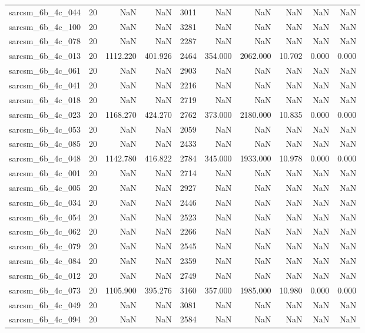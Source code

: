 \begin{tabular}{lrrrrrrrrr}
sarcsm\_6b\_4c\_044 & 20 & NaN & NaN & 3011 & NaN & NaN & NaN & NaN & NaN \\
sarcsm\_6b\_4c\_100 & 20 & NaN & NaN & 3281 & NaN & NaN & NaN & NaN & NaN \\
sarcsm\_6b\_4c\_078 & 20 & NaN & NaN & 2287 & NaN & NaN & NaN & NaN & NaN \\
sarcsm\_6b\_4c\_013 & 20 & 1112.220 & 401.926 & 2464 & 354.000 & 2062.000 & 10.702 & 0.000 & 0.000 \\
sarcsm\_6b\_4c\_061 & 20 & NaN & NaN & 2903 & NaN & NaN & NaN & NaN & NaN \\
sarcsm\_6b\_4c\_041 & 20 & NaN & NaN & 2216 & NaN & NaN & NaN & NaN & NaN \\
sarcsm\_6b\_4c\_018 & 20 & NaN & NaN & 2719 & NaN & NaN & NaN & NaN & NaN \\
sarcsm\_6b\_4c\_023 & 20 & 1168.270 & 424.270 & 2762 & 373.000 & 2180.000 & 10.835 & 0.000 & 0.000 \\
sarcsm\_6b\_4c\_053 & 20 & NaN & NaN & 2059 & NaN & NaN & NaN & NaN & NaN \\
sarcsm\_6b\_4c\_085 & 20 & NaN & NaN & 2433 & NaN & NaN & NaN & NaN & NaN \\
sarcsm\_6b\_4c\_048 & 20 & 1142.780 & 416.822 & 2784 & 345.000 & 1933.000 & 10.978 & 0.000 & 0.000 \\
sarcsm\_6b\_4c\_001 & 20 & NaN & NaN & 2714 & NaN & NaN & NaN & NaN & NaN \\
sarcsm\_6b\_4c\_005 & 20 & NaN & NaN & 2927 & NaN & NaN & NaN & NaN & NaN \\
sarcsm\_6b\_4c\_034 & 20 & NaN & NaN & 2446 & NaN & NaN & NaN & NaN & NaN \\
sarcsm\_6b\_4c\_054 & 20 & NaN & NaN & 2523 & NaN & NaN & NaN & NaN & NaN \\
sarcsm\_6b\_4c\_062 & 20 & NaN & NaN & 2266 & NaN & NaN & NaN & NaN & NaN \\
sarcsm\_6b\_4c\_079 & 20 & NaN & NaN & 2545 & NaN & NaN & NaN & NaN & NaN \\
sarcsm\_6b\_4c\_084 & 20 & NaN & NaN & 2359 & NaN & NaN & NaN & NaN & NaN \\
sarcsm\_6b\_4c\_012 & 20 & NaN & NaN & 2749 & NaN & NaN & NaN & NaN & NaN \\
sarcsm\_6b\_4c\_073 & 20 & 1105.900 & 395.276 & 3160 & 357.000 & 1985.000 & 10.980 & 0.000 & 0.000 \\
sarcsm\_6b\_4c\_049 & 20 & NaN & NaN & 3081 & NaN & NaN & NaN & NaN & NaN \\
sarcsm\_6b\_4c\_094 & 20 & NaN & NaN & 2584 & NaN & NaN & NaN & NaN & NaN \\

\end{tabular}
